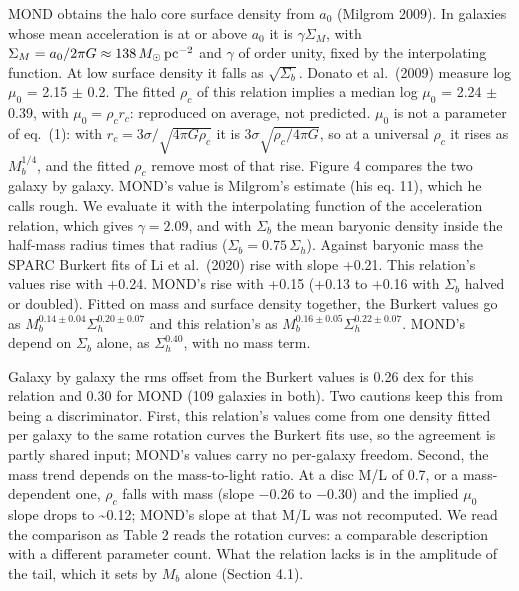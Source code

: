 \documentclass[
  10pt,
]{article}
\begin{document}
MOND obtains the halo core surface density from $a_0$ (Milgrom 2009). In galaxies whose mean acceleration is at or above $a_0$ it is $\gamma\Sigma_M$, with $\Sigma_M=a_0/2\pi G\approx138\,M_\odot\,{\rm pc}^{-2}$ and $\gamma$ of order unity, fixed by the interpolating function. At low surface density it falls as $\sqrt{\Sigma_b}$. Donato et al.~(2009) measure log $\mu_0$ = 2.15 $\pm$ 0.2. The fitted $\rho_c$ of this relation implies a median log $\mu_0$ = 2.24 $\pm$ 0.39, with $\mu_0=\rho_c r_c$: reproduced on average, not predicted. $\mu_0$ is not a parameter of eq.~(1): with $r_c=3\sigma/\sqrt{4\pi G\rho_c}$ it is $3\sigma\sqrt{\rho_c/4\pi G}$, so at a universal $\rho_c$ it rises as $M_b^{1/4}$, and the fitted $\rho_c$ remove most of that rise. Figure 4 compares the two galaxy by galaxy. MOND's value is Milgrom's estimate (his eq. 11), which he calls rough. We evaluate it with the interpolating function of the acceleration relation, which gives $\gamma=2.09$, and with $\Sigma_b$ the mean baryonic density inside the half-mass radius times that radius ($\Sigma_b=0.75\,\Sigma_h$). Against baryonic mass the SPARC Burkert fits of Li et al.~(2020) rise with slope +0.21. This relation's values rise with +0.24. MOND's rise with +0.15 (+0.13 to +0.16 with $\Sigma_b$ halved or doubled). Fitted on mass and surface density together, the Burkert values go as $M_b^{0.14\pm0.04}\Sigma_h^{0.20\pm0.07}$ and this relation's as $M_b^{0.16\pm0.05}\Sigma_h^{0.22\pm0.07}$. MOND's depend on $\Sigma_b$ alone, as $\Sigma_h^{0.40}$, with no mass term.

Galaxy by galaxy the rms offset from the Burkert values is 0.26 dex for this relation and 0.30 for MOND (109 galaxies in both). Two cautions keep this from being a discriminator. First, this relation's values come from one density fitted per galaxy to the same rotation curves the Burkert fits use, so the agreement is partly shared input; MOND's values carry no per-galaxy freedom. Second, the mass trend depends on the mass-to-light ratio. At a disc M/L of 0.7, or a mass-dependent one, $\rho_c$ falls with mass (slope $-0.26$ to $-0.30$) and the implied $\mu_0$ slope drops to \textasciitilde{}0.12; MOND's slope at that M/L was not recomputed. We read the comparison as Table 2 reads the rotation curves: a comparable description with a different parameter count. What the relation lacks is in the amplitude of the tail, which it sets by $M_b$ alone (Section 4.1).
\end{document}
